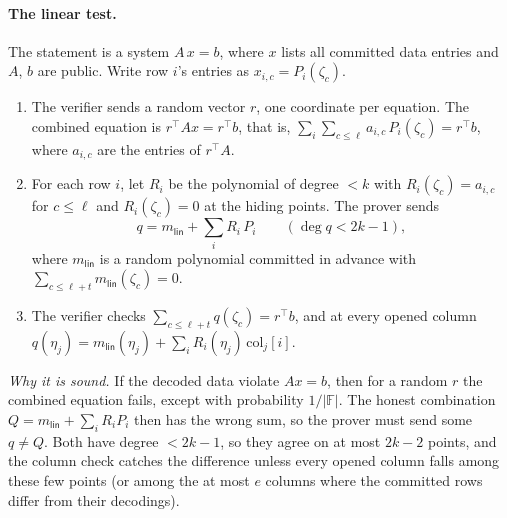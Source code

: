 \documentclass[11pt,a4paper]{article}
\newcommand{\F}{\mathbb{F}}
\theoremstyle{definition}
\theoremstyle{plain}
\begin{document}
\paragraph{The linear test.} The statement is a system $A\,x=b$, where $x$ lists all committed data
entries and $A$, $b$ are public. Write row $i$'s entries as $x_{i,c}=P_i(\zeta_c)$.
\begin{enumerate}[leftmargin=1.5em,itemsep=1pt]
\item The verifier sends a random vector $r$, one coordinate per equation. The combined equation is
  $r^{\top}Ax=r^{\top}b$, that is, $\sum_i\sum_{c\le\ell}a_{i,c}\,P_i(\zeta_c)=r^{\top}b$, where
  $a_{i,c}$ are the entries of $r^{\top}A$.
\item For each row $i$, let $R_i$ be the polynomial of degree $<k$ with $R_i(\zeta_c)=a_{i,c}$ for
  $c\le\ell$ and $R_i(\zeta_c)=0$ at the hiding points. The prover sends
  \[
    q=m_{\mathsf{lin}}+\sum_iR_i\,P_i \qquad(\deg q<2k-1),
  \]
  where $m_{\mathsf{lin}}$ is a random polynomial committed in advance with
  $\sum_{c\le\ell+t}m_{\mathsf{lin}}(\zeta_c)=0$.
\item The verifier checks $\sum_{c\le\ell+t}q(\zeta_c)=r^{\top}b$, and at every opened column
  $q(\eta_j)=m_{\mathsf{lin}}(\eta_j)+\sum_iR_i(\eta_j)\,\mathrm{col}_j[i]$.
\end{enumerate}
\emph{Why it is sound.} If the decoded data violate $Ax=b$, then for a random $r$ the combined
equation fails, except with probability $1/|\F|$. The honest combination $Q=m_{\mathsf{lin}}+\sum_iR_iP_i$
then has the wrong sum, so the prover must send some $q\ne Q$. Both have degree $<2k-1$, so they
agree on at most $2k-2$ points, and the column check catches the difference unless every opened
column falls among these few points (or among the at most $e$ columns where the committed rows differ
from their decodings).
\end{document}
